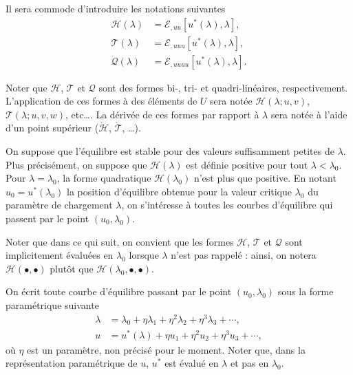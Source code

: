 \documentclass[12pt, final]{amsart}
\begin{document}
Il sera commode d'introduire les notations suivantes
\begin{align}
  \mathcal H(\lambda)&=\mathcal E_{,uu}[u^\ast(\lambda), \lambda],\\
  \mathcal T(\lambda)&=\mathcal E_{,uuu}[u^\ast(\lambda), \lambda],\\
  \mathcal Q(\lambda)&=\mathcal E_{,uuuu}[u^\ast(\lambda), \lambda].
\end{align}

Noter que \(\mathcal H\), \(\mathcal T\) et \(\mathcal Q\) sont des formes bi-,
tri- et quadri-linéaires, respectivement. L'application de ces formes à des
éléments de \(U\) sera notée \(\mathcal H(\lambda; u, v)\),
\(\mathcal T(\lambda; u, v, w)\), etc\dots. La dérivée de ces formes par
rapport à \(\lambda\) sera notée à l'aide d'un point supérieur
(\(\dot{\mathcal H}\), \(\dot{\mathcal T}\), \dots).

On suppose que l'équilibre est stable pour des valeurs suffisamment petites de
\(\lambda\). Plus précisément, on suppose que \(\mathcal H(\lambda)\) est
définie positive pour tout \(\lambda<\lambda_0\). Pour \(\lambda=\lambda_0\),
la forme quadratique \(\mathcal H(\lambda_0)\) n'est plus que positive. En
notant \(u_0=u^\ast(\lambda_0)\) la position d'équilibre obtenue pour la valeur
critique \(\lambda_0\) du paramètre de chargement \(\lambda\), on s'intéresse à
toutes les courbes d'équilibre qui passent par le point \((u_0, \lambda_0)\).

Noter que dans ce qui suit, on convient que les formes \(\mathcal H\),
\(\mathcal T\) et \(\mathcal Q\) sont implicitement évaluées en \(\lambda_0\)
lorsque \(\lambda\) n'est pas rappelé : ainsi, on notera
\(\mathcal H(\bullet, \bullet)\) plutôt que
\(\mathcal H(\lambda_0, \bullet, \bullet)\).

On écrit toute courbe d'équilibre passant par le point \((u_0, \lambda_0)\)
sous la forme paramétrique suivante
\begin{align}
  \label{eq:20211115075817}
  \lambda&=\lambda_0+\eta\lambda_1+\eta^2\lambda_2+\eta^3\lambda_3+\cdots,\\
  \label{eq:20211115075835}
  u&=u^\ast(\lambda)+\eta u_1+\eta^2 u_2+\eta^3u_3+\cdots,
\end{align}
où \(\eta\) est un paramètre, non précisé pour le moment. Noter que, dans la
représentation paramétrique de \(u\), \(u^\ast\) est évalué en \(\lambda\) et
pas en \(\lambda_0\).
\end{document}
